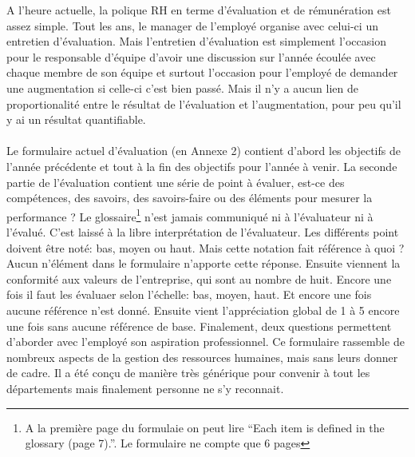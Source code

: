 A l'heure actuelle, la polique RH en terme d'évaluation et de rémunération est assez simple. Tout les ans, le manager de l'employé organise avec celui-ci un entretien d'évaluation. Mais l'entretien d'évaluation est simplement l'occasion pour le responsable d'équipe d'avoir une discussion sur l'année écoulée avec chaque membre de son équipe et surtout l'occasion pour l'employé de demander une augmentation si celle-ci c'est bien passé. Mais il n'y a aucun lien de proportionalité entre le résultat de l'évaluation et l'augmentation, pour peu qu'il y ai un résultat quantifiable.

\paragraph{}Le formulaire actuel d'évaluation (en Annexe 2) contient d'abord les objectifs de l'année précédente et tout à la fin des objectifs pour l'année à venir. La seconde partie de l'évaluation contient une série de point à évaluer, est-ce des compétences, des savoirs, des savoirs-faire ou des éléments pour mesurer la performance ? Le glossaire\footnote{A la première page du formulaie on peut lire \enquote{Each item is defined in the glossary (page 7).}. Le formulaire ne compte que 6 pages} n'est jamais communiqué ni à l'évaluateur ni à l'évalué. C'est laissé à la libre interprétation de l'évaluateur. Les différents point doivent être noté: bas, moyen ou haut. Mais cette notation fait référence à quoi ? Aucun n'élément dans le formulaire n'apporte cette réponse. Ensuite viennent la conformité aux valeurs de l'entreprise, qui sont au nombre de huit. Encore une fois il faut les évaluaer selon l'échelle: bas, moyen, haut. Et encore une fois aucune référence n'est donné. Ensuite vient l'appréciation global de 1 à 5 encore une fois sans aucune référence de base. Finalement, deux questions permettent d'aborder avec l'employé son aspiration professionnel. Ce formulaire rassemble de nombreux aspects de la gestion des ressources humaines, mais sans leurs donner de cadre. Il a été conçu de manière très générique pour convenir à tout les départements mais finalement personne ne s'y reconnait.


